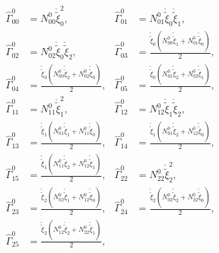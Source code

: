 \begin{equation}\begin{aligned}
\widehat{\Gamma}^{0}_{00} &= N^{0}_{00} \mathring{{\widetilde{{\xi}}}}_{0}^{2}, & 
\widehat{\Gamma}^{0}_{01} &= N^{0}_{01} \mathring{{\widetilde{{\xi}}}}_{0} \mathring{{\widetilde{{\xi}}}}_{1},\\[1ex]
\widehat{\Gamma}^{0}_{02} &= N^{0}_{02} \mathring{{\widetilde{{\xi}}}}_{0} \mathring{{\widetilde{{\xi}}}}_{2}, & 
\widehat{\Gamma}^{0}_{03} &= \frac{\mathring{{\widetilde{{\xi}}}}_{0} \left(N^{0}_{00} \mathring{{\widetilde{{\xi}}}}_{1} + N^{0}_{01} \mathring{{\widetilde{{\xi}}}}_{0}\right)}{2},\\[1ex]
\widehat{\Gamma}^{0}_{04} &= \frac{\mathring{{\widetilde{{\xi}}}}_{0} \left(N^{0}_{00} \mathring{{\widetilde{{\xi}}}}_{2} + N^{0}_{02} \mathring{{\widetilde{{\xi}}}}_{0}\right)}{2}, & 
\widehat{\Gamma}^{0}_{05} &= \frac{\mathring{{\widetilde{{\xi}}}}_{0} \left(N^{0}_{01} \mathring{{\widetilde{{\xi}}}}_{2} + N^{0}_{02} \mathring{{\widetilde{{\xi}}}}_{1}\right)}{2},\\[1ex]
\widehat{\Gamma}^{0}_{11} &= N^{0}_{11} \mathring{{\widetilde{{\xi}}}}_{1}^{2}, & 
\widehat{\Gamma}^{0}_{12} &= N^{0}_{12} \mathring{{\widetilde{{\xi}}}}_{1} \mathring{{\widetilde{{\xi}}}}_{2},\\[1ex]
\widehat{\Gamma}^{0}_{13} &= \frac{\mathring{{\widetilde{{\xi}}}}_{1} \left(N^{0}_{01} \mathring{{\widetilde{{\xi}}}}_{1} + N^{0}_{11} \mathring{{\widetilde{{\xi}}}}_{0}\right)}{2}, & 
\widehat{\Gamma}^{0}_{14} &= \frac{\mathring{{\widetilde{{\xi}}}}_{1} \left(N^{0}_{01} \mathring{{\widetilde{{\xi}}}}_{2} + N^{0}_{12} \mathring{{\widetilde{{\xi}}}}_{0}\right)}{2},\\[1ex]
\widehat{\Gamma}^{0}_{15} &= \frac{\mathring{{\widetilde{{\xi}}}}_{1} \left(N^{0}_{11} \mathring{{\widetilde{{\xi}}}}_{2} + N^{0}_{12} \mathring{{\widetilde{{\xi}}}}_{1}\right)}{2}, & 
\widehat{\Gamma}^{0}_{22} &= N^{0}_{22} \mathring{{\widetilde{{\xi}}}}_{2}^{2},\\[1ex]
\widehat{\Gamma}^{0}_{23} &= \frac{\mathring{{\widetilde{{\xi}}}}_{2} \left(N^{0}_{02} \mathring{{\widetilde{{\xi}}}}_{1} + N^{0}_{12} \mathring{{\widetilde{{\xi}}}}_{0}\right)}{2}, & 
\widehat{\Gamma}^{0}_{24} &= \frac{\mathring{{\widetilde{{\xi}}}}_{2} \left(N^{0}_{02} \mathring{{\widetilde{{\xi}}}}_{2} + N^{0}_{22} \mathring{{\widetilde{{\xi}}}}_{0}\right)}{2},\\[1ex]
\widehat{\Gamma}^{0}_{25} &= \frac{\mathring{{\widetilde{{\xi}}}}_{2} \left(N^{0}_{12} \mathring{{\widetilde{{\xi}}}}_{2} + N^{0}_{22} \mathring{{\widetilde{{\xi}}}}_{1}\right)}{2}, & 

\end{aligned}
\end{equation}
